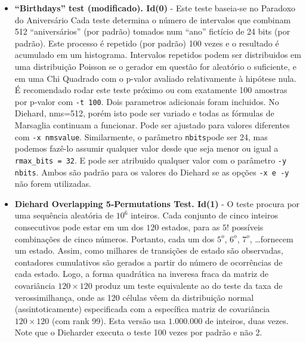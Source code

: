    \begin{itemize}
   \item \textbf{``Birthdays'' test (modificado). Id(0)} -  Este teste baseia-se no Paradoxo do Aniversário Cada teste determina o número de intervalos que combinam 512 ``aniversários'' (por padrão) tomados num ``ano'' fictício de 24 bits (por padrão). Este processo é repetido (por padrão) 100 vezes e o resultado é acumulado em um histograma. Intervalos repetidos podem ser distribuidos em uma distribuição Poisson se o gerador em questão for aleatório o suficiente, e em uma Chi Quadrado com o p-valor avaliado relativamente à hipótese nula. É recomendado rodar este teste próximo ou com exatamente 100 amostras por p-valor com \texttt{-t 100}. Dois parametros adicionais foram incluidos. No Diehard, nms=512, porém isto pode ser variado e todas as fórmulas de Marsaglia continuam a funcionar. Pode ser ajustado para valores diferentes com \texttt{-x nmsvalue}. Similarmente, o parâmetro \texttt{nbits}pode ser 24, mas podemos fazê-lo assumir qualquer valor desde que seja menor ou igual a \texttt{rmax\_bits = 32}. E pode ser atribuido qualquer valor com o parâmetro \texttt{-y nbits}. Ambos são padrão para os valores do Diehard se as opções \texttt{-x e -y} não forem utilizadas.
   
   \item \textbf{Diehard Overlapping 5-Permutations Test. Id(1)} - O teste procura por uma sequência aleatória de $10^6$ inteiros. Cada conjunto de cinco inteiros consecutivos pode estar em um dos $120$ estados, para as $5!$ possíveis combinações de cinco números. Portanto, cada um dos $5^{o}$, $6^{o}$, $7^{o}$, \dots fornecem um estado. Assim, como milhares de transições de estado são observadas, contadores cumulativos são gerados a partir do número de ocorrências de cada estado. Logo, a forma quadrática na inveresa fraca da matriz de covariância $120\times120$ produz um teste equivalente ao do teste da taxa de verossimilhança, onde as 120 células vêem da distribuição normal (assintoticamente) especificada com a específica matriz de covariância $120\times120$ (com rank 99). Esta versão usa $1.000.000$ de inteiros, duas vezes. Note que o Dieharder executa o teste 100 vezes por padrão e não 2.
   

\end{itemize}
